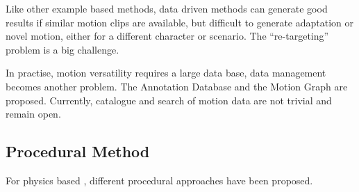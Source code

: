 Like other example based methods, data driven methods can generate good results if similar motion clips are available, but difficult to generate  adaptation or novel motion, either for a different character or scenario. 
The  ``re-targeting'' problem is a big challenge.

In practise, motion versatility requires a large data base,  data management becomes another problem. 
The Annotation Database \citep{Arikan2003} and the Motion Graph \citep{kovar2008motion} are proposed. 
Currently, catalogue and search of motion data are not trivial and remain open\citep{keogh2004indexing,muller2005efficient}.

\subsection{Procedural Method}
For physics based \cms, different procedural approaches have been proposed.
